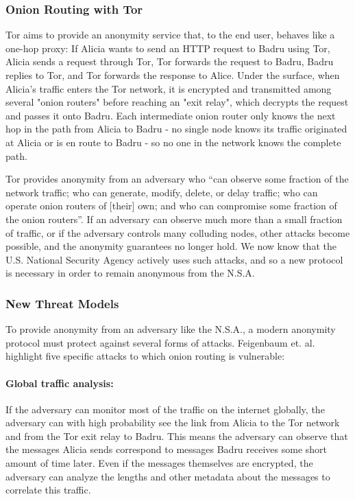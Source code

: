   \subsubsection{Onion Routing with Tor}
  \label{Subsubsection:Tor}
    Tor aims to provide an anonymity service that, to the end user, behaves like
    a one-hop proxy: If Alicia wants to send an HTTP request to Badru using Tor,
    Alicia sends a request through Tor, Tor forwards the request to Badru, Badru
    replies to Tor, and Tor forwards the response to Alice. Under the surface,
    when Alicia's traffic enters the Tor network, it is encrypted and
    transmitted among several "onion routers" before reaching an "exit relay",
    which decrypts the request and passes it onto Badru. Each intermediate onion
    router only knows the next hop in the path from Alicia to Badru - no single
    node knows its traffic originated at Alicia or is en route to Badru - so no
    one in the network knows the complete path.

    Tor provides anonymity from an adversary who ``can observe some fraction of
    the network traffic; who can generate, modify, delete, or delay traffic; who
    can operate onion routers of [their] own; and who can compromise some
    fraction of the onion routers''\cite{dingledine_tor:_2004}. If an adversary
    can observe much more than a small fraction of traffic, or if the adversary
    controls many colluding nodes, other attacks become possible, and the
    anonymity guarantees no longer hold. We now know that the U.S. National
    Security Agency actively uses such attacks, and so a new protocol is
    necessary in order to remain anonymous from the N.S.A.

  \subsubsection{New Threat Models}
  \label{Subsubsection:NewThreats} To
    provide anonymity from an adversary like the N.S.A., a modern anonymity
    protocol must protect against several forms of attacks. Feigenbaum et.
    al.\cite{feigenbaum_seeking_2013} highlight five specific attacks to which
    onion routing is vulnerable:
    \paragraph{Global traffic analysis:} If the
    adversary can monitor most of the traffic on the internet globally, the
    adversary can with high probability see the link from Alicia to the Tor
    network and from the Tor exit relay to Badru. This means the adversary can
    observe that the messages Alicia sends correspond to messages Badru receives
    some short amount of time later. Even if the messages themselves are
    encrypted, the adversary can analyze the lengths and other metadata about
    the messages to correlate this traffic.
